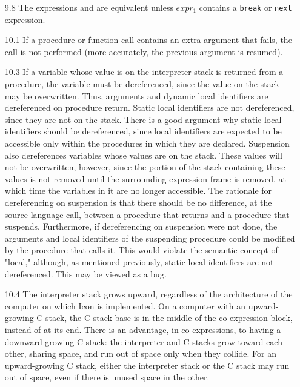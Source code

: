 \begin{itemize}
\goodbreak\item[9.8]
The expressions
and
are equivalent unless $expr_1$ contains a \texttt{break} or \texttt{next} expression.

\goodbreak\item[10.1]
If a procedure or function call contains an extra argument that fails, the
call is not performed (more accurately, the previous argument is resumed).

\goodbreak\item[10.3]
If a variable whose value is on the interpreter stack is returned from a procedure,
the variable must be dereferenced, since the value on the stack
may be overwritten. Thus, arguments and dynamic local identifiers are
dereferenced on procedure return. Static local identifiers are not dereferenced,
since they are not on the stack. There is a good argument why
static local identifiers should be dereferenced, since local identifiers are
expected to be accessible only within the procedures in which they are
declared. Suspension also dereferences variables whose values are on the
stack. These values will not be overwritten, however, since the portion of
the stack containing these values is not removed until the surrounding
expression frame is removed, at which time the variables in it are no
longer accessible. The rationale for dereferencing on suspension is that
there should be no difference, at the source-language call, between a procedure
that returns and a procedure that suspends. Furthermore, if dereferencing
on suspension were not done, the arguments and local
identifiers of the suspending procedure could be modified by the procedure
that calls it. This would violate the semantic concept of "local,"
although, as mentioned previously, static local identifiers are not dereferenced.
This may be viewed as a bug.

\goodbreak\item[10.4]
The interpreter stack grows upward, regardless of the architecture of the
computer on which Icon is implemented. On a computer with an
upward-growing C stack, the C stack base is in the middle of the co-expression
block, instead of at its end. There is an advantage, in co-expressions,
to having a downward-growing C stack: the interpreter and
C stacks grow toward each other, sharing space, and run out of space only
when they collide. For an upward-growing C stack, either the interpreter
stack or the C stack may run out of space, even if there is unused space in
the other.


\end{itemize}
